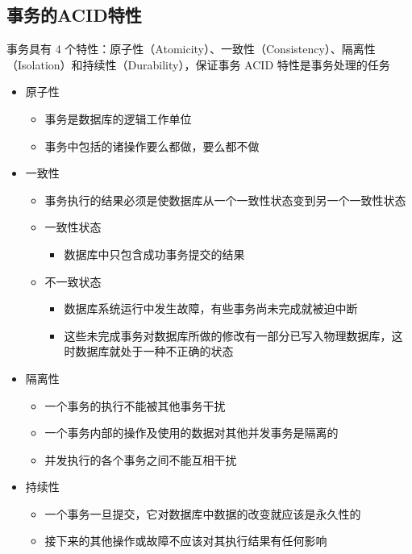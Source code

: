 \subsection{事务的ACID特性}
事务具有 4 个特性：原子性（Atomicity）、一致性（Consistency）、隔离性（Isolation）和持续性（Durability），保证事务 ACID 特性是事务处理的任务
\begin{itemize}
    \item 原子性
    \begin{itemize}
        \item 事务是数据库的逻辑工作单位
        \item 事务中包括的诸操作要么都做，要么都不做
    \end{itemize}
    \item 一致性
    \begin{itemize}
        \item 事务执行的结果必须是使数据库从一个一致性状态变到另一个一致性状态
        \item 一致性状态
        \begin{itemize}
            \item 数据库中只包含成功事务提交的结果
        \end{itemize}
        \item 不一致状态
        \begin{itemize}
            \item 数据库系统运行中发生故障，有些事务尚未完成就被迫中断
            \item 这些未完成事务对数据库所做的修改有一部分已写入物理数据库，这时数据库就处于一种不正确的状态
        \end{itemize}
    \end{itemize}
    \item 隔离性
    \begin{itemize}
        \item 一个事务的执行不能被其他事务干扰
        \item 一个事务内部的操作及使用的数据对其他并发事务是隔离的
        \item 并发执行的各个事务之间不能互相干扰
    \end{itemize}
    \item 持续性
    \begin{itemize}
        \item 一个事务一旦提交，它对数据库中数据的改变就应该是永久性的
        \item 接下来的其他操作或故障不应该对其执行结果有任何影响
    \end{itemize}
\end{itemize}

